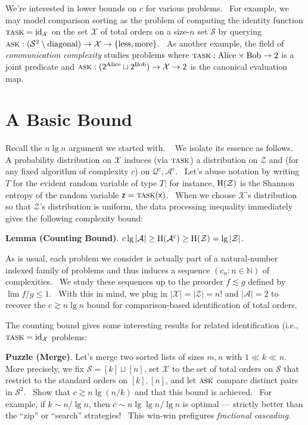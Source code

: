 \documentclass[11pt, justified]{tufte-book}
\newcommand{\NN}{\mathbb{N}}
\newcommand{\Aa}{\mathcal{A}}
\newcommand{\Qq}{\mathcal{Q}}
\newcommand{\Ss}{\mathcal{S}}
\newcommand{\Xx}{\mathcal{X}}
\newcommand{\Zz}{\mathcal{Z}}
\newcommand{\Task}{\textsc{task}}
\newcommand{\Ask}{\textsc{ask}}
\theoremstyle{definition}
\newcommand{\msub}[1]{\vspace{0.3cm}\section{\color{mblu}\textsf{#1}}}
\newcommand{\mpar}[1]{\par\noindent\textbf{#1}.}
\begin{document}
        We're interested in lower bounds on $c$ for various problems.  For
        example, we may model comparison sorting as the
        problem of computing the identity function $\Task = {\rm id}_{\Xx}$ on
        the set $\Xx$ of total orders on a size-$n$ set $\Ss$ by querying
        $\Ask:(\Ss^2 \setminus \text{diagonal}) \to \Xx\to \{\text{less},
        \text{more}\}$.  As another example, the field of \emph{communication
        complexity} studies problems where $\Task: \text{Alice}\times
        \text{Bob} \to 2$ is a joint predicate and $\Ask: (2^{\text{Alice}}
        \sqcup 2^{\text{Bob}}) \to \Xx \to 2$ is the canonical evaluation map.


      \msub{A Basic Bound}
        Recall the $n\lg n$ argument we started with.   We isolate its essence
        as follows.  A probability distribution on $\Xx$ induces (via $\Task$)
        a distribution on $\Zz$ and (for any fixed algorithm of complexity $c$)
        on $\Qq^c, \Aa^c$.  Let's abuse notation by writing $T$ for the evident
        random variable of type $T$; for instance, ${\rm H}(\Zz)$ is the
        Shannon entropy of the random variable $\textsf{z} =
        \Task(\textsf{x})$.  When we choose $\Xx$'s distribution so that
        $\Zz$'s distribution is uniform, the data processing inequality
        immediately gives the following complexity bound:

        \mpar{Lemma (Counting Bound)}
          $c \lg |\Aa| \geq {\rm H}(\Aa^c) \geq {\rm H}(\Zz) = \lg |\Zz|$.

        As is usual, each problem we consider is actually part of a
        natural-number indexed family of problems and thus induces a sequence
        $(c_n: n\in \NN)$ of complexities.  We study these sequences up to the
        preorder $f\lesssim g$ defined by $\lim f/g \leq 1$.  With this in
        mind, we plug in $|\Xx| = |\Zz| = n!$ and $|\Aa| = 2$ to recover the $c
        \gtrsim n\lg n$ bound for comparison-based identification of total
        orders.

        The counting bound gives some interesting results for related
        identification (i.e., $\Task={\rm id}_\Xx$ problems:

        \mpar{Puzzle (Merge)}
          Let's merge two sorted lists of sizes $m, n$ with $1\ll k\ll n$. 
          More precisely, we fix $\Ss = [k] \sqcup [n]$, set $\Xx$ to the set
          of total orders on $\Ss$ that restrict to the standard orders on
          $[k], [n]$, and let $\Ask$ compare distinct pairs in $\Ss^2$.  Show
          that $c \gtrsim n \lg(n/k)$ and that this bound is achieved.  For
          example, if $k \sim n/\lg n$, then $c \sim n \lg \lg n / \lg n$ is
          optimal --- strictly better than the ``zip'' or ``search'' strategies! 
          This win-win prefigures \emph{fractional cascading}.
\end{document}
